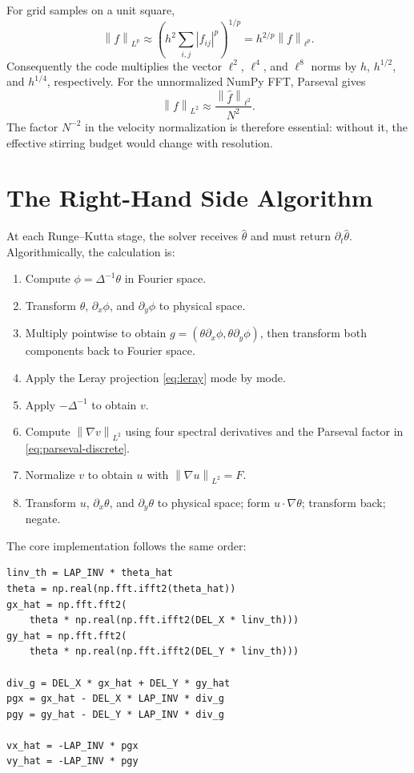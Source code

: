 \documentclass[12pt,a4paper]{article}
\newcommand{\norm}[1]{\left\lVert#1\right\rVert}
\newcommand{\lapinv}{\Delta^{-1}}
\theoremstyle{definition}
\begin{document}
For grid samples on a unit square,
\begin{equation}
  \norm{f}_{L^p}\approx
  \left(h^2\sum_{i,j}|f_{ij}|^p\right)^{1/p}
  =h^{2/p}\norm{f}_{\ell^p}.
\end{equation}
Consequently the code multiplies the vector $\ell^2$, $\ell^4$, and
$\ell^8$ norms by $h$, $h^{1/2}$, and $h^{1/4}$, respectively. For the
unnormalized NumPy FFT, Parseval gives
\begin{equation}
  \norm{f}_{L^2}\approx\frac{\norm{\widehat f}_{\ell^2}}{N^2}.
  \label{eq:parseval-discrete}
\end{equation}
The factor $N^{-2}$ in the velocity normalization is therefore essential:
without it, the effective stirring budget would change with resolution.

\section{The Right-Hand Side Algorithm}

At each Runge--Kutta stage, the solver receives $\widehat\theta$ and must
return $\partial_t\widehat\theta$. Algorithmically, the calculation is:
\begin{enumerate}
  \item Compute $\phi=\lapinv\theta$ in Fourier space.
  \item Transform $\theta$, $\partial_x\phi$, and $\partial_y\phi$ to
        physical space.
  \item Multiply pointwise to obtain
        $g=(\theta\partial_x\phi,\theta\partial_y\phi)$, then transform
        both components back to Fourier space.
  \item Apply the Leray projection \eqref{eq:leray} mode by mode.
  \item Apply $-\lapinv$ to obtain $v$.
  \item Compute $\norm{\nabla v}_{L^2}$ using four spectral derivatives and
        the Parseval factor in \eqref{eq:parseval-discrete}.
  \item Normalize $v$ to obtain $u$ with
        $\norm{\nabla u}_{L^2}=F$.
  \item Transform $u$, $\partial_x\theta$, and $\partial_y\theta$ to
        physical space; form $u\cdot\nabla\theta$; transform back; negate.
\end{enumerate}

The core implementation follows the same order:
\begin{lstlisting}[style=python]
linv_th = LAP_INV * theta_hat
theta = np.real(np.fft.ifft2(theta_hat))
gx_hat = np.fft.fft2(
    theta * np.real(np.fft.ifft2(DEL_X * linv_th)))
gy_hat = np.fft.fft2(
    theta * np.real(np.fft.ifft2(DEL_Y * linv_th)))

div_g = DEL_X * gx_hat + DEL_Y * gy_hat
pgx = gx_hat - DEL_X * LAP_INV * div_g
pgy = gy_hat - DEL_Y * LAP_INV * div_g

vx_hat = -LAP_INV * pgx
vy_hat = -LAP_INV * pgy
\end{lstlisting}
\end{document}
